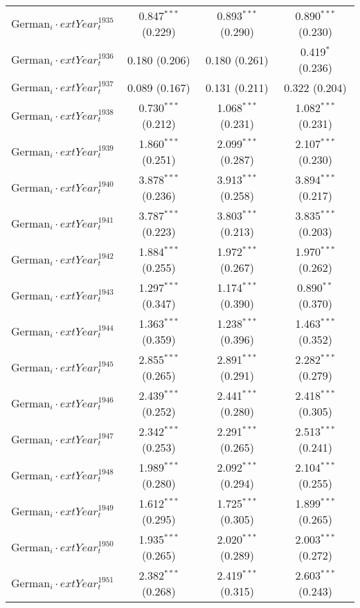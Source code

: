 \begin{table}[!h]
\begin{tabular}{@{\extracolsep{5pt}}lccc}
  $\text{German}_{i} \cdot 	ext{Year}_{t}^1935$ & 0.847$^{***}$ (0.229) & 0.893$^{***}$ (0.290) & 0.890$^{***}$ (0.230) \\ 
  $\text{German}_{i} \cdot 	ext{Year}_{t}^1936$ & 0.180 (0.206) & 0.180 (0.261) & 0.419$^{*}$ (0.236) \\ 
  $\text{German}_{i} \cdot 	ext{Year}_{t}^1937$ & 0.089 (0.167) & 0.131 (0.211) & 0.322 (0.204) \\ 
  $\text{German}_{i} \cdot 	ext{Year}_{t}^1938$ & 0.730$^{***}$ (0.212) & 1.068$^{***}$ (0.231) & 1.082$^{***}$ (0.231) \\ 
  $\text{German}_{i} \cdot 	ext{Year}_{t}^1939$ & 1.860$^{***}$ (0.251) & 2.099$^{***}$ (0.287) & 2.107$^{***}$ (0.230) \\ 
  $\text{German}_{i} \cdot 	ext{Year}_{t}^1940$ & 3.878$^{***}$ (0.236) & 3.913$^{***}$ (0.258) & 3.894$^{***}$ (0.217) \\ 
  $\text{German}_{i} \cdot 	ext{Year}_{t}^1941$ & 3.787$^{***}$ (0.223) & 3.803$^{***}$ (0.213) & 3.835$^{***}$ (0.203) \\ 
  $\text{German}_{i} \cdot 	ext{Year}_{t}^1942$ & 1.884$^{***}$ (0.255) & 1.972$^{***}$ (0.267) & 1.970$^{***}$ (0.262) \\ 
  $\text{German}_{i} \cdot 	ext{Year}_{t}^1943$ & 1.297$^{***}$ (0.347) & 1.174$^{***}$ (0.390) & 0.890$^{**}$ (0.370) \\ 
  $\text{German}_{i} \cdot 	ext{Year}_{t}^1944$ & 1.363$^{***}$ (0.359) & 1.238$^{***}$ (0.396) & 1.463$^{***}$ (0.352) \\ 
  $\text{German}_{i} \cdot 	ext{Year}_{t}^1945$ & 2.855$^{***}$ (0.265) & 2.891$^{***}$ (0.291) & 2.282$^{***}$ (0.279) \\ 
  $\text{German}_{i} \cdot 	ext{Year}_{t}^1946$ & 2.439$^{***}$ (0.252) & 2.441$^{***}$ (0.280) & 2.418$^{***}$ (0.305) \\ 
  $\text{German}_{i} \cdot 	ext{Year}_{t}^1947$ & 2.342$^{***}$ (0.253) & 2.291$^{***}$ (0.265) & 2.513$^{***}$ (0.241) \\ 
  $\text{German}_{i} \cdot 	ext{Year}_{t}^1948$ & 1.989$^{***}$ (0.280) & 2.092$^{***}$ (0.294) & 2.104$^{***}$ (0.255) \\ 
  $\text{German}_{i} \cdot 	ext{Year}_{t}^1949$ & 1.612$^{***}$ (0.295) & 1.725$^{***}$ (0.305) & 1.899$^{***}$ (0.265) \\ 
  $\text{German}_{i} \cdot 	ext{Year}_{t}^1950$ & 1.935$^{***}$ (0.265) & 2.020$^{***}$ (0.289) & 2.003$^{***}$ (0.272) \\ 
  $\text{German}_{i} \cdot 	ext{Year}_{t}^1951$ & 2.382$^{***}$ (0.268) & 2.419$^{***}$ (0.315) & 2.603$^{***}$ (0.243) \\ 

\end{tabular}
\end{table}
